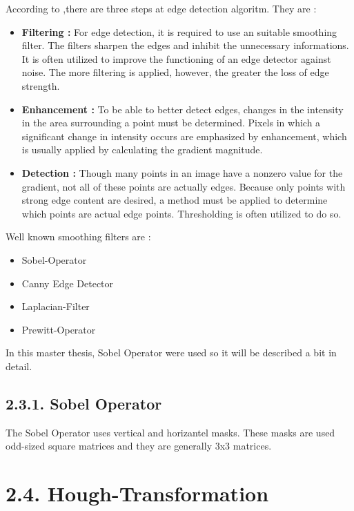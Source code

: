 According to \cite{Machine_Vision},there are three steps at edge detection algoritm. They are :
\begin{itemize}
 \item \textbf{Filtering : } For edge detection, it is required to use an suitable smoothing filter. The filters 
 sharpen the edges and inhibit the unnecessary informations. It is often utilized to improve the functioning of 
 an edge detector against noise. The more filtering is applied, however, the greater the loss of edge strength.
 
 \item \textbf{Enhancement : } To be able to better detect edges, changes in the intensity in the area 
 surrounding a point must be determined. Pixels in which a significant change in intensity occurs are 
 emphasized by enhancement, which is usually applied by calculating the gradient magnitude.
  
 \item \textbf{Detection : } Though many points in an image have a nonzero value for the gradient, not all of 
 these points are actually edges. Because only points with strong edge content are desired, a method must be 
 applied to determine which points are actual edge points. Thresholding is often utilized to do so.
 
\end{itemize}



Well known smoothing filters are :

\begin{itemize}
 \item Sobel-Operator
 \item Canny Edge Detector
 \item Laplacian-Filter
 \item Prewitt-Operator
 \end{itemize}
 
 In this master thesis, Sobel Operator were used so it will be described a bit in detail.
%
\subsection*{2.3.1. Sobel Operator}\label{sec:Sobel Operator}

The Sobel Operator uses vertical and horizantel masks. These masks are used odd-sized square matrices and 
they are generally 3x3 matrices.
%
\section*{2.4. Hough-Transformation}\label{sec:Hough - Transformation}
%

